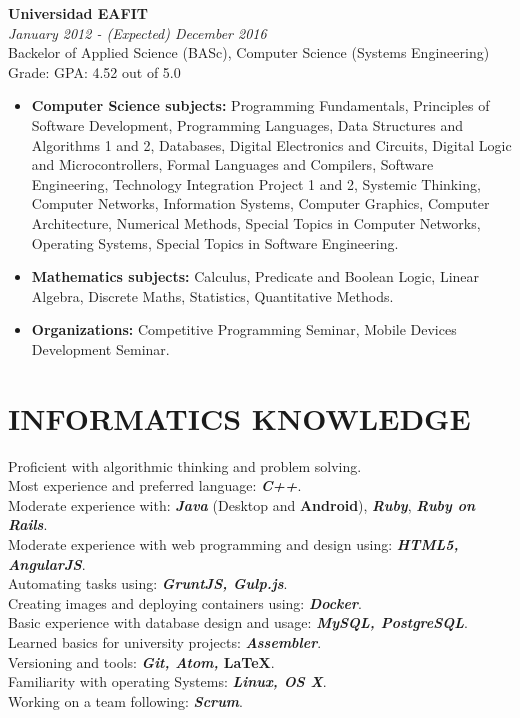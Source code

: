 \documentclass[margin, 10pt]{res} %
\begin{document}
\begin{resume}
\textbf{Universidad EAFIT} \\
\textit{January 2012 - (Expected) December 2016} \\
Backelor of Applied Science (BASc), Computer Science (Systems Engineering) \\
Grade: GPA: 4.52 out of 5.0
\begin{itemize}
  \item \textbf{Computer Science subjects:} Programming Fundamentals, Principles of Software
                Development, Programming Languages, Data Structures and Algorithms 1 and 2,
                Databases, Digital Electronics and Circuits, Digital Logic and Microcontrollers,
                Formal Languages and Compilers, Software Engineering,
                Technology Integration Project 1 and 2, Systemic Thinking, Computer Networks,
                Information Systems, Computer Graphics, Computer Architecture, Numerical Methods,
                Special Topics in Computer Networks, Operating Systems, Special Topics in Software
                Engineering.
  \item \textbf{Mathematics subjects:} Calculus, Predicate and Boolean Logic, Linear Algebra,
                                       Discrete Maths, Statistics, Quantitative Methods.
  \item \textbf{Organizations:} Competitive Programming Seminar, Mobile Devices Development Seminar.
\end{itemize}


\section{INFORMATICS KNOWLEDGE}
Proficient with algorithmic thinking and problem solving. \\
Most experience and preferred language: \textbf{\textit{C++}}. \\
Moderate experience with: \textbf{\textit{Java}} (Desktop and \textbf{Android}),
                          \textbf{\textit{Ruby}}, \textbf{\textit{Ruby on Rails}}. \\
Moderate experience with web programming and design using: \textbf{\textit{HTML5, AngularJS}}. \\
Automating tasks using: \textbf{\textit{GruntJS, Gulp.js}}. \\
Creating images and deploying containers using: \textbf{\textit{Docker}}. \\
Basic experience with database design and usage: \textbf{\textit{MySQL, PostgreSQL}}. \\
Learned basics for university projects: \textbf{\textit{Assembler}}. \\
Versioning and tools: \textbf{\textit{Git, Atom,} \LaTeX}.\\
Familiarity with operating Systems: \textbf{\textit{Linux, OS X}}. \\
Working on a team following: \textbf{\textit{Scrum}}.\\


\end{resume}
\end{document}
